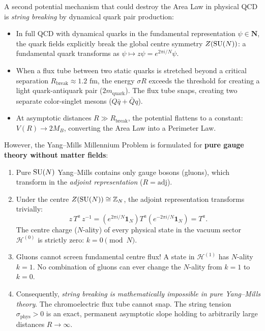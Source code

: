 A second potential mechanism that could destroy the Area Law in physical QCD is \emph{string breaking} by dynamical quark pair production:
\begin{itemize}
    \item In full QCD with dynamical quarks in the fundamental representation $\psi \in \mathbf{N}$, the quark fields explicitly break the global centre symmetry $Z(\mathrm{SU}(N))$: a fundamental quark transforms as $\psi \mapsto z \psi = e^{2\pi i / N} \psi$.
    \item When a flux tube between two static quarks is stretched beyond a critical separation $R_{\mathrm{break}} \approx 1.2 \text{ fm}$, the energy $\sigma R$ exceeds the threshold for creating a light quark-antiquark pair ($2 m_{\mathrm{quark}}$). The flux tube snaps, creating two separate color-singlet mesons ($Q\bar{q} + \bar{Q}q$).
    \item At asymptotic distances $R \gg R_{\mathrm{break}}$, the potential flattens to a constant: $V(R) \to 2 M_B$, converting the Area Law into a Perimeter Law.
\end{itemize}

However, the Yang--Mills Millennium Problem is formulated for \textbf{pure gauge theory without matter fields}:
\begin{enumerate}
    \item Pure $\mathrm{SU}(N)$ Yang--Mills contains only gauge bosons (gluons), which transform in the \emph{adjoint representation} ($R = \mathrm{adj}$).
    \item Under the centre $Z(\mathrm{SU}(N)) \cong \mathbb{Z}_N$, the adjoint representation transforms trivially:
    \begin{equation}
    z \, T^a \, z^{-1} = (e^{2\pi i / N} \mathbf{1}_N) T^a (e^{-2\pi i / N} \mathbf{1}_N) = T^a.
    \end{equation}
    The centre charge ($N$-ality) of every physical state in the vacuum sector $\mathcal{H}^{(0)}$ is strictly zero: $k = 0 \pmod N$.
    \item Gluons cannot screen fundamental centre flux! A state in $\mathcal{H}^{(1)}$ has $N$-ality $k = 1$. No combination of gluons can ever change the $N$-ality from $k = 1$ to $k = 0$.
    \item Consequently, \emph{string breaking is mathematically impossible in pure Yang--Mills theory}. The chromoelectric flux tube cannot snap. The string tension $\sigma_{\mathrm{phys}} > 0$ is an exact, permanent asymptotic slope holding to arbitrarily large distances $R \to \infty$.
\end{enumerate}

